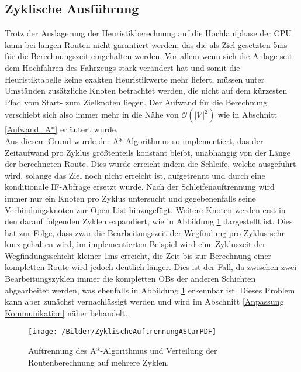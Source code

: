 		\subsection{Zyklische Ausführung}
			\label{zyklische Auftrennung}
			Trotz der Auslagerung der Heuristikberechnung auf die Hochlaufphase der CPU kann bei langen Routen nicht garantiert werden, das die als Ziel gesetzten 5ms für die Berechnungszeit eingehalten werden. Vor allem wenn sich die Anlage seit dem Hochfahren des Fahrzeugs stark verändert hat und somit die Heuristiktabelle keine exakten Heuristikwerte mehr liefert, müssen unter Umständen zusätzliche Knoten betrachtet werden, die nicht auf dem kürzesten Pfad vom Start- zum Zielknoten liegen. Der Aufwand für die Berechnung verschiebt sich also immer mehr in die Nähe von $\mathcal{O}(|\mathcal{V}|^2)$ wie in Abschnitt \ref{Aufwand_A*} erläutert wurde.
			\\[4pt]		
			Aus diesem Grund wurde der A*-Algorithmus so implementiert, das der Zeitaufwand pro Zyklus größtenteils konstant bleibt, unabhängig von der Länge der berechneten Route. Dies wurde erreicht indem die Schleife, welche ausgeführt wird, solange das Ziel noch nicht erreicht ist, aufgetrennt und durch eine konditionale IF-Abfrage ersetzt wurde. Nach der Schleifenauftrennung wird immer nur ein Knoten pro Zyklus untersucht und gegebenenfalls seine Verbindungsknoten zur Open-List hinzugefügt. Weitere Knoten werden erst in den darauf folgenden Zyklen expandiert, wie in Abbildung \ref{Schleifenaufteilung} dargestellt ist. Dies hat zur Folge, dass zwar die Bearbeitungszeit der Wegfindung pro Zyklus sehr kurz gehalten wird, im implementierten Beispiel wird eine Zykluszeit der Wegfindungsschicht kleiner 1ms erreicht, die Zeit bis zur Berechnung einer kompletten Route wird jedoch deutlich länger. Dies ist der Fall, da zwischen zwei Bearbeitungszyklen immer die kompletten \ac{OB}s der anderen Schichten abgearbeitet werden, was ebenfalls in Abbildung \ref{Schleifenaufteilung} erkennbar ist. Dieses Problem kann aber zunächst vernachlässigt werden und wird im Abschnitt \ref{Anpassung Kommunikation} näher behandelt.
		
			
			\begin{figure}[h]
				\centering
				\texttt{[image: /Bilder/ZyklischeAuftrennungAStarPDF]}
				\vspace{0.2cm}
				\caption{Auftrennung des A*-Algorithmus und Verteilung der Routenberechnung auf mehrere Zyklen.}\label{Schleifenaufteilung}
			\end{figure}
			
